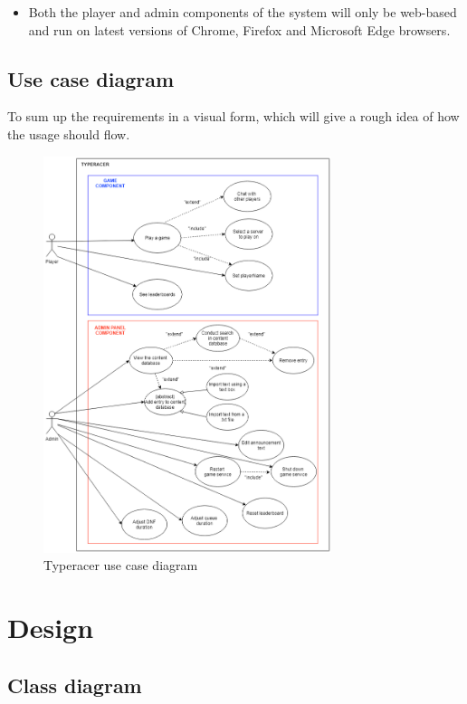 \documentclass[titlepage]{article}
\begin{document}
\begin{itemize}
	\item Both the player and admin components of the system will only be web-based and run on latest versions of Chrome, Firefox and Microsoft Edge browsers.
\end{itemize}

\newpage

\subsection{Use case diagram}

To sum up the requirements in a visual form, which will give a rough idea of how the usage should flow.

\begin{figure}[ht]
	\centering
	\includegraphics[width=0.75\textwidth]{use_case_diagram.png}
	\caption{Typeracer use case diagram}
	\label{fig:usecase-diag}
\end{figure}

\newpage

\section{Design}

\subsection{Class diagram}
\end{document}
